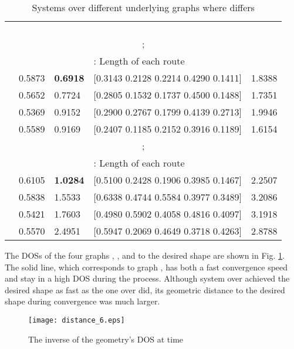 \documentclass[times]{rncauth}
\begin{document}
\begin{table}
  \caption{Systems over different underlying graphs where  differs}
  \label{table:six}
 \begin{center}
\begin{lrbox}{\tablebox}
\begin{tabular}{|l|l|l|l|l|}
\hline \multicolumn{5}{|c|}{}\\
\multicolumn{5}{|c|}{} \\
\multicolumn{5}{|c|}{
}\\
\multicolumn{5}{|c|}{} \\
\hline
\multicolumn{5}{|c|}{;}\\
\hline
&   &   &  : Length of each route & \\
\hline
 &0.5873 & \textbf{0.6918} & [0.3143  0.2128  0.2214    0.4290  0.1411]& 1.8388\\
& 0.5652 & 0.7724  &[0.2805  0.1532  0.1737    0.4500  0.1488] &1.7351\\
 & 0.5369& 0.9152&  [0.2900  0.2767  0.1799    0.4139  0.2713]  &  1.9946\\
& 0.5589  &0.9169 & [0.2407  0.1185  0.2152    0.3916  0.1189]  &  1.6154\\
\hline \multicolumn{5}{|c|}{;}\\
\hline
&   &   &  : Length of each route & \\
\hline
 &0.6105 & \textbf{1.0284}  &[0.5100  0.2428  0.1906    0.3985 0.1467]& 2.2507\\
& 0.5838  &1.5533  &[0.6338  0.4744  0.5584    0.3977 0.3489] &3.2086\\
& 0.5421  &1.7603 & [0.4980  0.5902  0.4058    0.4816 0.4097] &3.1918\\
& 0.5570  &2.4951&  [0.5947  0.2069  0.4649    0.3718 0.4263] &2.8788\\
\hline
\end{tabular}
\end{lrbox}
\scalebox{0.7}{\usebox{\tablebox}}
\end{center}
\end{table}


The DOSs of the four graphs , ,  and
 to the desired shape  are shown in Fig. \ref{fig:for_bias_six}. The solid line,
which corresponds to graph , has both a fast convergence speed
and stay in a high DOS during the process. Although system over
 achieved the desired shape as fast as the one over  did,
its geometric distance to the desired shape during convergence was much larger.
\begin{figure}
\begin{center}
\texttt{[image: distance\_6.eps]}
\caption{The inverse of the geometry's DOS  at time }
\label{fig:for_bias_six}
\end{center}
\end{figure}
\end{document}
